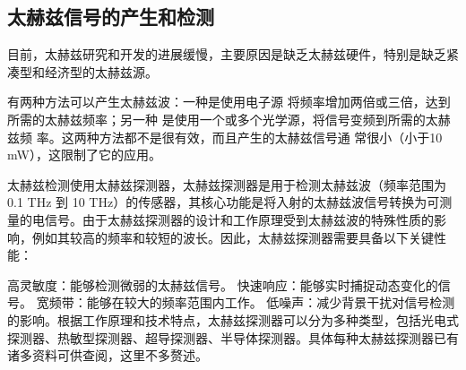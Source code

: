 \subsection{太赫兹信号的产生和检测}
目前，太赫兹研究和开发的进展缓慢，主要原因是缺乏太赫兹硬件，特别是缺乏紧凑型和经济型的太赫兹源。

有两种方法可以产生太赫兹波：一种是使用电子源
将频率增加两倍或三倍，达到所需的太赫兹频率；另一种
是使用一个或多个光学源，将信号变频到所需的太赫兹频
率。这两种方法都不是很有效，而且产生的太赫兹信号通
常很小（小于10 mW），这限制了它的应用。

太赫兹检测使用太赫兹探测器，太赫兹探测器是用于检测太赫兹波（频率范围为 0.1 THz 到 10 THz）的传感器，其核心功能是将入射的太赫兹波信号转换为可测量的电信号。由于太赫兹探测器的设计和工作原理受到太赫兹波的特殊性质的影响，例如其较高的频率和较短的波长\cite{10697786}。因此，太赫兹探测器需要具备以下关键性能：

高灵敏度：能够检测微弱的太赫兹信号。
快速响应：能够实时捕捉动态变化的信号。
宽频带：能够在较大的频率范围内工作。
低噪声：减少背景干扰对信号检测的影响。根据工作原理和技术特点，太赫兹探测器可以分为多种类型，包括光电式探测器、热敏型探测器、超导探测器、半导体探测器。具体每种太赫兹探测器已有诸多资料可供查阅，这里不多赘述。

